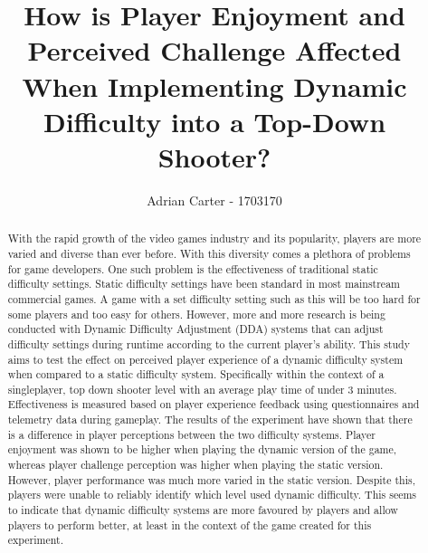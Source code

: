 \documentclass[journal]{IEEEtran}
\begin{document}
%
\title{How is Player Enjoyment and Perceived Challenge Affected When Implementing Dynamic Difficulty into a Top-Down Shooter?}
%
%
\author{Adrian Carter - 1703170}


\maketitle

\begin{abstract}
With the rapid growth of the video games industry and its popularity, players are more varied and diverse than ever before. With this diversity comes a plethora of problems for game developers. One such problem is the effectiveness of traditional static difficulty settings.  Static difficulty settings have been standard in most mainstream commercial games. A game with a set difficulty setting such as this will be too hard for some players and too easy for others. However, more and more research is being conducted with Dynamic Difficulty Adjustment (DDA) systems that can adjust difficulty settings during runtime according to the current  player's ability. This study aims to test the effect on perceived player experience of a dynamic difficulty system when compared to a static difficulty system. Specifically within the context of a singleplayer, top down shooter level with an average play time of under 3 minutes. Effectiveness is measured based on player experience feedback using questionnaires and telemetry data during gameplay. The results of the experiment have shown that there is a difference in player perceptions between the two difficulty systems. Player enjoyment was shown to be higher when playing the dynamic version of the game, whereas player challenge perception was higher when playing the static version. However, player performance was much more varied in the static version. Despite this, players were unable to reliably identify which level used dynamic difficulty. This seems to indicate that dynamic difficulty systems are more favoured by players and allow players to perform better, at least in the context of the game created for this experiment. 

\end{abstract}
\end{document}
